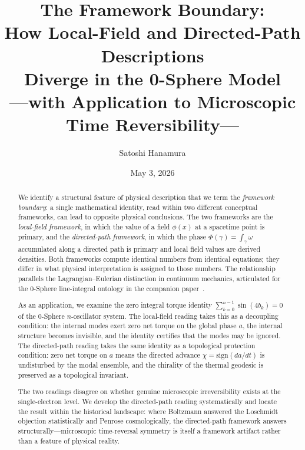 \documentclass[%
 reprint, amsmath,amssymb, aps, prb, ]{revtex4-2}
\numberwithin{equation}{section}
\begin{document}
\title{
The Framework Boundary:\\
How Local-Field and Directed-Path Descriptions\\
Diverge in the 0-Sphere Model\\
{\normalsize ---with Application to Microscopic Time Reversibility---}
}

\author{Satoshi Hanamura}
\date{May 3, 2026}

\begin{abstract}
We identify a structural feature of physical description that we term the \emph{framework boundary}: a single mathematical identity, read within two different conceptual frameworks, can lead to opposite physical conclusions. The two frameworks are the \emph{local-field framework}, in which the value of a field $\phi(x)$ at a spacetime point is primary, and the \emph{directed-path framework}, in which the phase $\Phi(\gamma) = \int_\gamma\omega$ accumulated along a directed path is primary and local field values are derived densities. Both frameworks compute identical numbers from identical equations; they differ in what physical interpretation is assigned to those numbers. The relationship parallels the Lagrangian--Eulerian distinction in continuum mechanics, articulated for the 0-Sphere line-integral ontology in the companion paper~\cite{hanamura55}.

As an application, we examine the zero integral torque identity $\sum_{k=0}^{n-1}\sin(4b_k)=0$ of the 0-Sphere $n$-oscillator system. The local-field reading takes this as a decoupling condition: the internal modes exert zero net torque on the global phase $a$, the internal structure becomes invisible, and the identity certifies that the modes may be ignored. The directed-path reading takes the same identity as a topological protection condition: zero net torque on $a$ means the directed advance $\chi=\mathrm{sign}(da/dt)$ is undisturbed by the modal ensemble, and the chirality of the thermal geodesic is preserved as a topological invariant.

The two readings disagree on whether genuine microscopic irreversibility exists at the single-electron level. We develop the directed-path reading systematically and locate the result within the historical landscape: where Boltzmann answered the Loschmidt objection statistically and Penrose cosmologically, the directed-path framework answers structurally---microscopic time-reversal symmetry is itself a framework artifact rather than a feature of physical reality.
\end{abstract}
\end{document}
